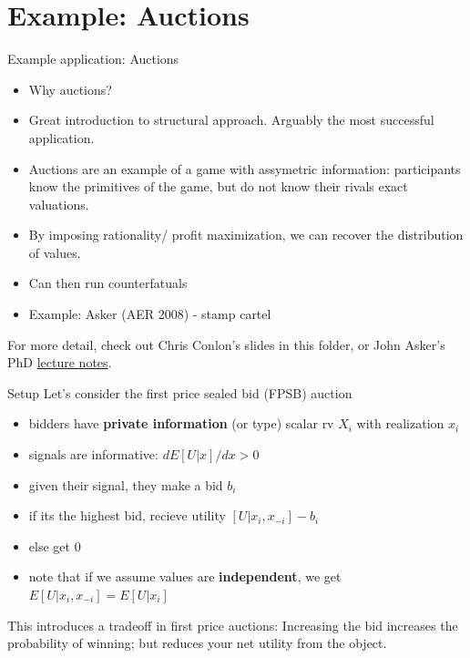 \section{Example: Auctions}

\begin{frame}{Example application: Auctions}
  \begin{itemize}
    \item Why auctions? 
    \item Great introduction to structural approach. Arguably the most successful application. 
    \item Auctions are an example of a game with assymetric information: participants know the primitives of the game, but do not know their rivals exact valuations. 
    \item By imposing rationality/ profit maximization, we can recover the distribution of values. 
    \item Can then run counterfatuals
    \item Example: Asker (AER 2008) - stamp cartel 
\end{itemize}

For more detail, check out Chris Conlon's slides in this folder, or John Asker's PhD \href{http://www.johnasker.com}{lecture notes}.

\end{frame}

\begin{frame}{Setup}
Let's consider the first price sealed bid (FPSB) auction

\begin{itemize}
  \item bidders have \textbf{private information} (or type) scalar rv $X_i$ with realization $x_i$
  \item signals are informative: $dE[U|x]/dx >0$ 
  \item given their signal, they make a bid $b_i$
  \item if its the highest bid, recieve utility $[U| x_i,x_{-i}] - b_i$ 
  \item else get $0$
  \item note that if we assume values are \textbf{independent}, we get $E[U| x_i,x_{-i}]=E[U | x_i]$
\end{itemize}

This introduces a tradeoff in first price auctions: Increasing the bid increases the probability of winning; but reduces your net utility from the object.

\end{frame}

